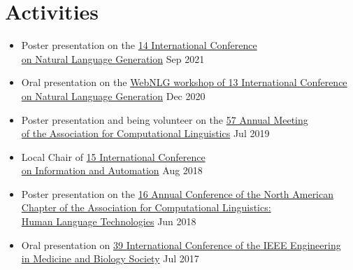 
\section{\sc Activities}

\begin{itemize}
    \item Poster presentation on the \href{https://inlg2021.github.io/}{14 International Conference \\on Natural Language Generation} \hfill Sep 2021
    \item Oral presentation on the \href{https://webnlg-challenge.loria.fr/workshop_2020/}{WebNLG workshop of 13 International Conference \\on Natural Language Generation} \hfill Dec 2020
    \item Poster presentation and being volunteer on the \href{http://acl2019.org/}{57 Annual Meeting \\of the Association for Computational Linguistics} \hfill Jul 2019
    \item Local Chair of \href{http://2018.ieee-icia.org/}{15 International Conference \\on Information and Automation} \hfill Aug 2018
    \item Poster presentation on the \href{http://naacl2018.org/}{16 Annual Conference of the North American \\Chapter of the Association for Computational Linguistics: \\Human Language Technologies} \hfill Jun 2018
    \item Oral presentation on \href{https://embc.embs.org/2017/}{39 International Conference of the IEEE Engineering \\in Medicine and Biology Society} \hfill Jul 2017
\end{itemize}

